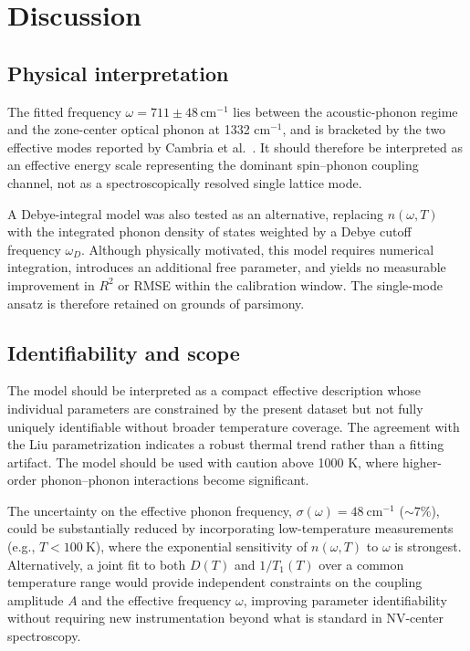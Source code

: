 \documentclass[12pt]{article}
\begin{document}
\section{Discussion}
\subsection{Physical interpretation}
The fitted frequency $\omega = 711 \pm 48\,\mathrm{cm}^{-1}$ lies between the acoustic-phonon regime and the zone-center optical phonon at 1332 cm$^{-1}$, and is bracketed by the two effective modes reported by Cambria et al.~\citep{cambria2024}. It should therefore be interpreted as an effective energy scale representing the dominant spin--phonon coupling channel, not as a spectroscopically resolved single lattice mode.

A Debye-integral model was also tested as an alternative, replacing $n(\omega,T)$ with the integrated phonon density of states weighted by a Debye cutoff frequency $\omega_D$. Although physically motivated, this model requires numerical integration, introduces an additional free parameter, and yields no measurable improvement in $R^2$ or RMSE within the calibration window. The single-mode ansatz is therefore retained on grounds of parsimony.

\subsection{Identifiability and scope}
The model should be interpreted as a compact effective description whose individual parameters are constrained by the present dataset but not fully uniquely identifiable without broader temperature coverage. The agreement with the Liu parametrization indicates a robust thermal trend rather than a fitting artifact. The model should be used with caution above 1000 K, where higher-order phonon--phonon interactions become significant.

The uncertainty on the effective phonon frequency, $\sigma(\omega) = 48\ \text{cm}^{-1}$ (${\sim}7\%$), could be substantially reduced by incorporating low-temperature measurements (e.g., $T < 100\ \text{K}$), where the exponential sensitivity of $n(\omega,T)$ to $\omega$ is strongest. Alternatively, a joint fit to both $D(T)$ and $1/T_1(T)$ over a common temperature range would provide independent constraints on the coupling amplitude $A$ and the effective frequency $\omega$, improving parameter identifiability without requiring new instrumentation beyond what is standard in NV-center spectroscopy.
\end{document}
